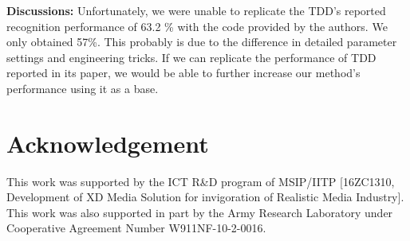 \documentclass[letterpaper]{article}
\begin{document}
{\flushleft\textbf{Discussions:} Unfortunately, we were unable to replicate the TDD's reported recognition performance of 63.2 \% with the code provided by the authors. We only obtained 57\%. This probably is due to the difference in detailed parameter settings and engineering tricks. If we can replicate the performance of TDD reported in its paper, we would be able to further increase our method's performance using it as a base.}

\section*{Acknowledgement}

This work was supported by the ICT R\&D program of MSIP/IITP [16ZC1310, Development of XD Media Solution for invigoration of Realistic Media Industry]. This work was also supported in part by the Army Research Laboratory under Cooperative Agreement Number W911NF-10-2-0016. 







\end{document}
